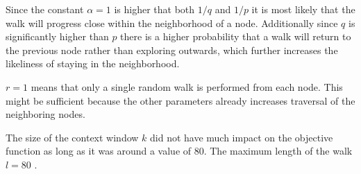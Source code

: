 Since the constant $\alpha = 1$ is higher that both $1/q$ and $1/p$ it is most likely that the walk will progress close within the neighborhood of a node. Additionally since $q$ is significantly higher than $p$ there is a higher probability that a walk will return to the previous node rather than exploring outwards, which further increases the likeliness of staying in the neighborhood.

$r=1$ means that only a single random walk is performed from each node. This might be sufficient because the other parameters already increases traversal of the neighboring nodes.

The size of the context window $k$ did not have much impact on the objective function as long as it was around a value of 80. The maximum length of the walk $l=80$ .

